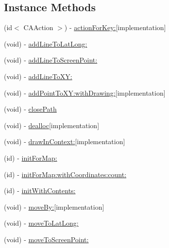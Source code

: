 \subsection*{Instance Methods}
\begin{DoxyCompactItemize}
\item 
(id$<$ C\-A\-Action $>$) -\/ \hyperlink{interface_r_m_path_aeff4f90d5d01092fd310a0b52d3c9d1c}{action\-For\-Key\-:}{\ttfamily  \mbox{[}implementation\mbox{]}}
\item 
(void) -\/ \hyperlink{interface_r_m_path_a233d38ded11a78015f57d9aee26e8c42}{add\-Line\-To\-Lat\-Long\-:}
\item 
(void) -\/ \hyperlink{interface_r_m_path_a9635a32a6026e63fdf1b34b243dd1d08}{add\-Line\-To\-Screen\-Point\-:}
\item 
(void) -\/ \hyperlink{interface_r_m_path_ac05f8be482e0aa0e3050247d5143f356}{add\-Line\-To\-X\-Y\-:}
\item 
(void) -\/ \hyperlink{interface_r_m_path_a63d207d98b22f4a77875fdf8d18b7ed5}{add\-Point\-To\-X\-Y\-:with\-Drawing\-:}{\ttfamily  \mbox{[}implementation\mbox{]}}
\item 
(void) -\/ \hyperlink{interface_r_m_path_acfcc36a04919726a503d9d692c365f3d}{close\-Path}
\item 
(void) -\/ \hyperlink{interface_r_m_path_a4b50da18017f5fc9530ff05401747da0}{dealloc}{\ttfamily  \mbox{[}implementation\mbox{]}}
\item 
(void) -\/ \hyperlink{interface_r_m_path_a4c02b41834cd9435a62bb2db42eff620}{draw\-In\-Context\-:}{\ttfamily  \mbox{[}implementation\mbox{]}}
\item 
(id) -\/ \hyperlink{interface_r_m_path_a29187a042475bad3699856e3385bb3ee}{init\-For\-Map\-:}
\item 
(id) -\/ \hyperlink{interface_r_m_path_acf830718a51227db7bebef87f58af3fa}{init\-For\-Map\-:with\-Coordinates\-:count\-:}
\item 
(id) -\/ \hyperlink{interface_r_m_path_af79f1923ee9c26625021fe3952076858}{init\-With\-Contents\-:}
\item 
(void) -\/ \hyperlink{interface_r_m_path_aa51fa75ed859403de65279c357720646}{move\-By\-:}{\ttfamily  \mbox{[}implementation\mbox{]}}
\item 
(void) -\/ \hyperlink{interface_r_m_path_a9dc844ebe9a05ba48a0ff601b7621684}{move\-To\-Lat\-Long\-:}
\item 
(void) -\/ \hyperlink{interface_r_m_path_a76134695ca29b3d58857a5d100a8db61}{move\-To\-Screen\-Point\-:}
\item 

\end{DoxyCompactItemize}
